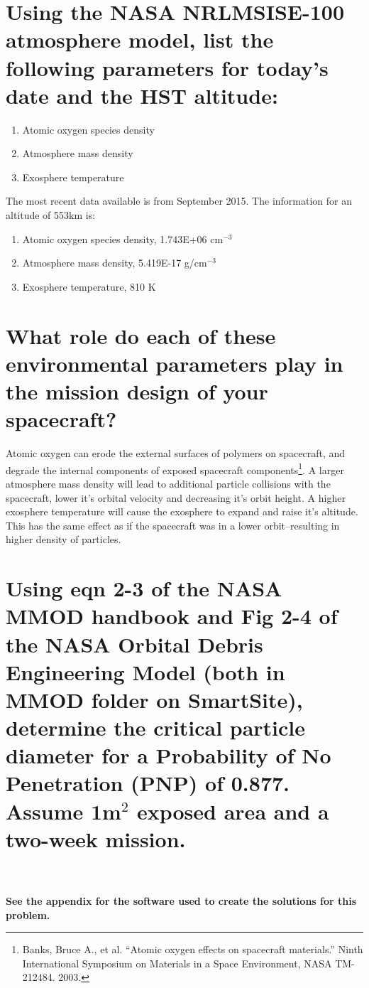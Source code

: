 \documentclass[onecolumn,10pt]{jhwhw}
\begin{document}
\part{Using the NASA NRLMSISE-100 atmosphere model, list the following parameters for today’s date and the HST altitude:}
\begin{enumerate}
\item Atomic oxygen species density
\item Atmosphere mass density
\item Exosphere temperature
\end{enumerate}
\vspace{1em}
The most recent data available is from September 2015. The information for an altitude of 553km is:
\begin{enumerate}
\item Atomic oxygen species density, 1.743E+06 cm$^{-3}$
\item Atmosphere mass density, 5.419E-17 g/cm$^{-3}$
\item Exosphere temperature, 810 K
\end{enumerate}

\part{What role do each of these environmental parameters play in the mission design of your spacecraft?}

Atomic oxygen can erode the external surfaces of polymers on spacecraft, and degrade the internal components of exposed spacecraft components\footnote{Banks, Bruce A., et al. ``Atomic oxygen effects on spacecraft materials.'' Ninth International Symposium on Materials in a Space Environment, NASA TM-212484. 2003.}. A larger atmosphere mass density will lead to additional particle collisions with the spacecraft, lower it's orbital velocity and decreasing it's orbit height. A higher exosphere temperature will cause the exosphere to expand and raise it's altitude. This has the same effect as if the spacecraft was in a lower orbit--resulting in higher density of particles.

\part{Using eqn 2-3 of the NASA MMOD handbook and Fig 2-4 of the NASA Orbital Debris Engineering Model (both in MMOD folder on SmartSite), determine the critical particle diameter for a Probability of No Penetration (PNP) of 0.877. Assume 1m$^2$ exposed area and
a two-week mission.}
\\
\\
\noindent \textbf{See the appendix for the software used to create the solutions for this problem.}
\end{document}
